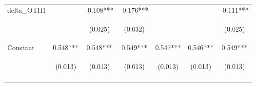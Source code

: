 \begin{center}
\begin{tabular}{lcccccc}
delta\_OTH1 &  & -0.108*** & -0.176*** &  &  & -0.111*** \\
\vspace{4pt} & \begin{footnotesize}\end{footnotesize} & \begin{footnotesize}(0.025)\end{footnotesize} & \begin{footnotesize}(0.032)\end{footnotesize} & \begin{footnotesize}\end{footnotesize} & \begin{footnotesize}\end{footnotesize} & \begin{footnotesize}(0.025)\end{footnotesize} \\
Constant & 0.548*** & 0.548*** & 0.549*** & 0.547*** & 0.546*** & 0.549*** \\
 & \begin{footnotesize}(0.013)\end{footnotesize} & \begin{footnotesize}(0.013)\end{footnotesize} & \begin{footnotesize}(0.013)\end{footnotesize} & \begin{footnotesize}(0.013)\end{footnotesize} & \begin{footnotesize}(0.013)\end{footnotesize} & \begin{footnotesize}(0.013)\end{footnotesize} \\
\vspace{4pt} & \begin{footnotesize}\end{footnotesize} & \begin{footnotesize}\end{footnotesize} & \begin{footnotesize}\end{footnotesize} & \begin{footnotesize}\end{footnotesize} & \begin{footnotesize}\end{footnotesize} & \begin{footnotesize}\end{footnotesize} \\

\end{tabular}
\end{center}
